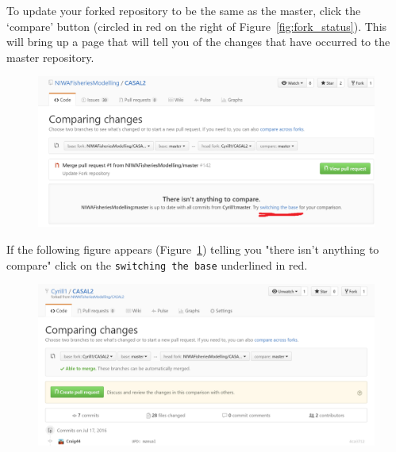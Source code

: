 To update your forked repository to be the same as the master, click the `compare' button (circled in red on the right of Figure~\ref{fig:fork_status}). This will bring up a page that will tell you of the changes that have occurred to the master repository. 
\clearpage
\begin{figure}[!ht]
	\centering
	\includegraphics[scale=0.6]{Figures/Compare_fork3.png}
	\caption{}\label{fig:fork_compare1}
\end{figure}

If the following figure appears (Figure~\ref{fig:fork_compare1}) telling you "there isn't anything to compare" click on the \texttt{switching the base} underlined in red.
\raggedbottom
\begin{figure}[!ht]
	\centering
	\includegraphics[scale=0.6]{Figures/Compare_fork4.png}
	\caption{}\label{fig:fork_compare2}
\end{figure}

